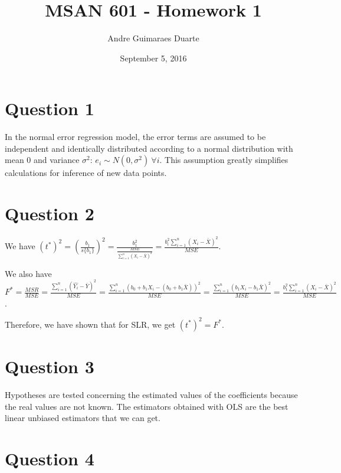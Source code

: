 \documentclass[]{article}
\title{MSAN 601 - Homework 1}
\author{Andre Guimaraes Duarte}
\date{September 5, 2016}
\begin{document}
\maketitle

\section*{Question 1}

In the normal error regression model, the error terms are assumed to be independent and identically distributed according to a normal distribution with mean $0$ and variance $\sigma^2$: $e_i \sim N(0, \sigma^2)\ \forall i$. This assumption greatly simplifies calculations for inference of new data points.

\section*{Question 2}
We have $(t^*)^2 = (\frac{b_1}{s\{b_1\}})^2 = \frac{b_1^2}{\frac{MSE}{\sum_{i=1}^n{(X_i - \bar{X})^2}}} = \frac{b_i^2 \sum_{i=1}^n{(X_i - \bar{X})^2}}{MSE}$.

We also have $F^* = \frac{MSR}{MSE} = \frac{\sum_{i=1}^n{(\hat{Y_i} - \bar{Y})^2}}{MSE} = \frac{\sum_{i=1}^n{(b_0 + b_1 X_i - (b_0 + b_1\bar{X}))^2}}{MSE} = \frac{\sum_{i=1}^n{(b_1 X_i - b_1\bar{X})^2}}{MSE} = \frac{b_1^2 \sum_{i=1}^n{(X_i - \bar{X})^2}}{MSE}$.

Therefore, we have shown that for SLR, we get $(t^*)^2 = F^*$.

\section*{Question 3}

Hypotheses are tested concerning the estimated values of the coefficients because the real values are not known. The estimators obtained with OLS are the best linear unbiased estimators that we can get.

\section*{Question 4}
\end{document}
